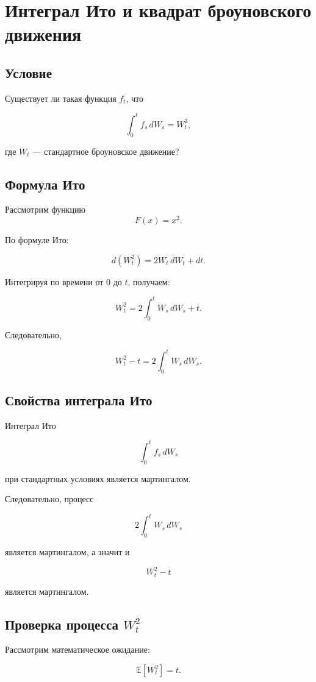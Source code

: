 \section*{Интеграл Ито и квадрат броуновского движения}

\subsection*{Условие}

Существует ли такая функция \(f_t\), что

\[
\int_0^t f_s\, dW_s = W_t^2,
\]

где \(W_t\) --- стандартное броуновское движение?

\subsection*{Формула Ито}

Рассмотрим функцию
\[
F(x)=x^2.
\]

По формуле Ито:

\[
d(W_t^2)=2W_t\, dW_t + dt.
\]

Интегрируя по времени от \(0\) до \(t\), получаем:

\[
W_t^2 = 2\int_0^t W_s\, dW_s + t.
\]

Следовательно,

\[
W_t^2 - t = 2\int_0^t W_s\, dW_s.
\]

\subsection*{Свойства интеграла Ито}

Интеграл Ито

\[
\int_0^t f_s\, dW_s
\]

при стандартных условиях является мартингалом.

Следовательно, процесс

\[
2\int_0^t W_s\, dW_s
\]

является мартингалом, а значит и

\[
W_t^2 - t
\]

является мартингалом.

\subsection*{Проверка процесса \(W_t^2\)}

Рассмотрим математическое ожидание:

\[
\mathbb E[W_t^2]=t.
\]

